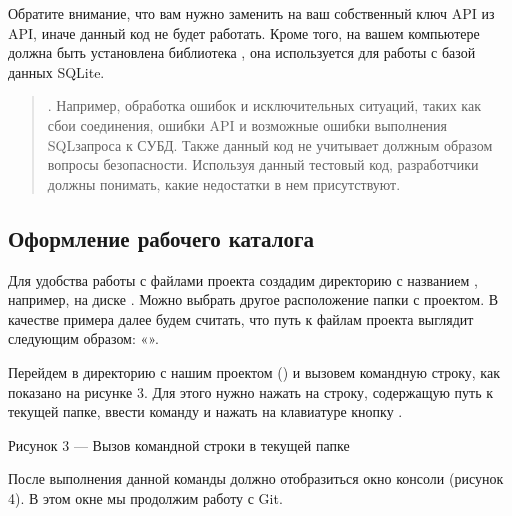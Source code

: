 \documentclass[letterpaper,10pt,russian]{sphinxmanual}
\begin{document}
\sphinxAtStartPar
Обратите внимание, что вам нужно заменить  на ваш собственный ключ API из  API, иначе данный код не будет работать. Кроме того, на вашем компьютере должна быть установлена библиотека , она используется для работы с базой данных SQLite.
\begin{quote}

\sphinxAtStartPar
{}.
Например, обработка ошибок и исключительных ситуаций, таких как сбои соединения, ошибки API и возможные ошибки выполнения SQL\sphinxhyphen{}запроса к СУБД. Также данный код не учитывает должным образом вопросы безопасности. Используя данный тестовый код, разработчики должны понимать, какие недостатки в нем присутствуют.
\end{quote}


\subsection{Оформление рабочего каталога}
\label{\detokenize{educational_materials/git_base/content:id6}}
\sphinxAtStartPar
Для удобства работы с файлами проекта создадим директорию с названием , например, на диске . Можно выбрать другое расположение папки с проектом. В качестве примера далее будем считать, что путь к файлам проекта выглядит следующим образом: «».

\sphinxAtStartPar
Перейдем в директорию с нашим проектом () и вызовем командную строку, как показано на рисунке 3. Для этого нужно нажать на строку, содержащую путь к текущей папке, ввести команду  и нажать на клавиатуре кнопку .

\sphinxAtStartPar
{}

\sphinxAtStartPar
Рисунок 3 — Вызов командной строки в текущей папке

\sphinxAtStartPar
После выполнения данной команды должно отобразиться окно консоли (рисунок 4). В этом окне мы продолжим работу с Git.

\sphinxAtStartPar
{}
\end{document}
